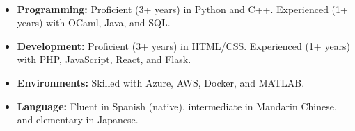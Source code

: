 \documentclass[11pt]{article}
\begin{document}
   \vspace{-7pt}\\
   \noindent\makebox[\linewidth]{\rule{7.5in}{0.3pt}}
   \begin{itemize}[itemsep=-.4em, leftmargin=1em]\vspace{-2mm}
     \item \textbf{Programming:} Proficient (3+ years) in Python and C++. Experienced (1+ years) with OCaml, Java, and SQL.
     \item \textbf{Development:} Proficient (3+ years) in HTML/CSS. Experienced (1+ years) with PHP, JavaScript, React, and Flask.
     \item \textbf{Environments:} Skilled with Azure, AWS, Docker, and MATLAB.
     \item \textbf{Language:} 
       Fluent in Spanish (native), intermediate in Mandarin Chinese, and elementary in Japanese.
   \end{itemize}

   
\end{document}
